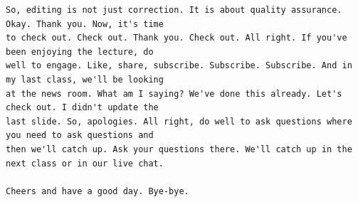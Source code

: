{\begin{Verbatim}
So, editing is not just correction. It is about quality assurance. Okay. Thank you. Now, it's time
to check out. Check out. Thank you. Check out. All right. If you've been enjoying the lecture, do
well to engage. Like, share, subscribe. Subscribe. Subscribe. And in my last class, we'll be looking
at the news room. What am I saying? We've done this already. Let's check out. I didn't update the
last slide. So, apologies. All right, do well to ask questions where you need to ask questions and
then we'll catch up. Ask your questions there. We'll catch up in the next class or in our live chat.

Cheers and have a good day. Bye-bye.
\end{Verbatim}
}
